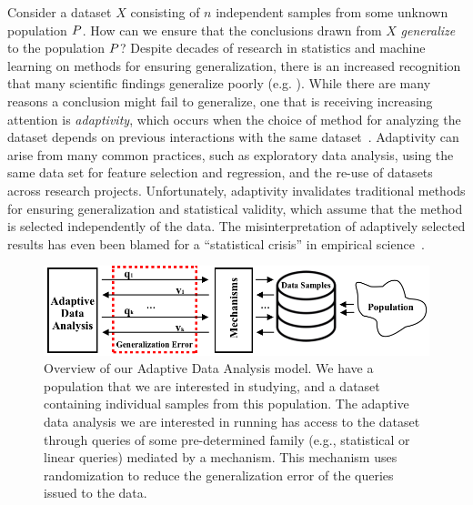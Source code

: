 Consider a dataset $X$ consisting of $n$ independent samples from some unknown population $P$.  How can we ensure that the conclusions drawn from $X$ \emph{generalize} to the population $P$?  Despite decades of research in statistics and machine learning on methods for ensuring generalization, there is an increased recognition that many scientific findings generalize poorly (e.g. 
\cite{Ioannidis05,GelmanL13}
).  While there are many reasons a conclusion might fail to generalize, one that is receiving increasing attention is \emph{adaptivity}, which occurs when the choice of method for analyzing the dataset depends on previous interactions with the same dataset~\cite{GelmanL13}.
%
 Adaptivity can arise from many common practices, such as exploratory data analysis, using the same data set for feature selection and regression, and the re-use of datasets across research projects.  Unfortunately, adaptivity invalidates traditional methods for ensuring generalization and statistical validity, which assume that the method is selected independently of the data. The misinterpretation of adaptively selected results has even been blamed for a ``statistical crisis'' in empirical science~\cite{GelmanL13}.

\begin{figure}
    \centering
    \includegraphics[width=0.7\columnwidth]{overview.png}
    \caption{Overview of our Adaptive Data Analysis model. We have a population that we are interested in studying, and a dataset containing individual samples from this population. The adaptive data analysis we are interested in running has access to the dataset through queries of some pre-determined family (e.g., statistical or linear queries) mediated by a mechanism. This mechanism uses randomization to reduce the generalization error of the queries issued to the data.}
    \label{fig:adaptivity-model-overview}
\vspace{-0.5cm}
\end{figure}


